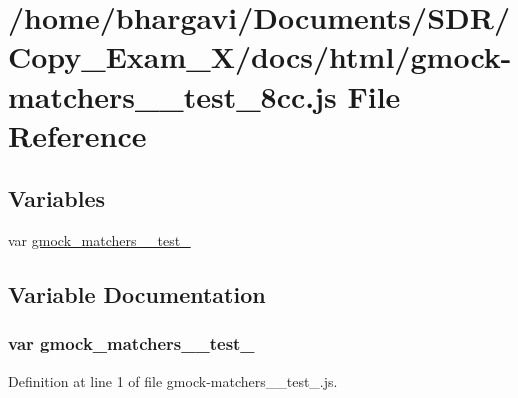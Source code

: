 \hypertarget{gmock-matchers____test__8cc_8js}{}\section{/home/bhargavi/\+Documents/\+S\+D\+R/\+Copy\+\_\+\+Exam\+\_\+X/docs/html/gmock-\/matchers\+\_\+\+\_\+test\+\_\+8cc.js File Reference}
\label{gmock-matchers____test__8cc_8js}
\subsection*{Variables}
\begin{DoxyCompactItemize}
\item 
var \hyperlink{gmock-matchers____test__8cc_8js_a3a7d38753e7a91fabdfa3900a9086384}{gmock\+\_\+matchers\+\_\+\+\_\+test\+\_}
\end{DoxyCompactItemize}


\subsection{Variable Documentation}
\subsubsection[{\texorpdfstring{gmock\+\_\+matchers\+\_\+\+\_\+test\+\_\+8cc}{gmock_matchers__test_8cc}}]{\setlength{\rightskip}{0pt plus 5cm}var gmock\+\_\+matchers\+\_\+\+\_\+test\+\_}\hypertarget{gmock-matchers____test__8cc_8js_a3a7d38753e7a91fabdfa3900a9086384}{}\label{gmock-matchers____test__8cc_8js_a3a7d38753e7a91fabdfa3900a9086384}


Definition at line 1 of file gmock-\/matchers\+\_\+\+\_\+test\+\_.\+js.

